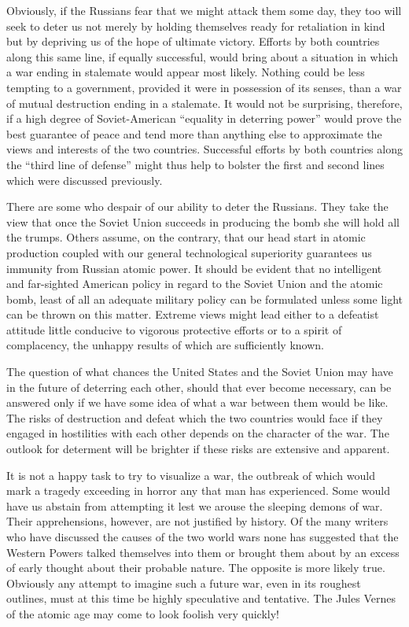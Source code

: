 Obviously, if the Russians fear that we might attack them some day, they too will seek to deter us not merely by holding themselves ready for retaliation in kind but by depriving us of the hope of ultimate victory. Efforts by both countries along this same line, if equally successful, would bring about a situation in which a war ending in stalemate would appear most likely. Nothing could be less tempting to a government, provided it were in possession of its senses, than a war of mutual destruction ending in a stalemate. It would not be surprising, therefore, if a high degree of Soviet-American ``equality in deterring power'' would prove the best guarantee of peace and tend more than anything else to approximate the views and interests of the two countries. Successful efforts by both countries along the ``third line of defense'' might thus help to bolster the first and second lines which were discussed previously.

There are some who despair of our ability to deter the Russians. They take the view that once the Soviet Union succeeds in producing the bomb she will hold all the trumps. Others assume, on the contrary, that our head start in atomic production coupled with our general technological superiority guarantees us immunity from Russian atomic power. It should be evident that no intelligent and far-sighted American policy in regard to the Soviet Union and the atomic bomb, least of all an adequate military policy can be formulated unless some light can be thrown on this matter. Extreme views might lead either to a defeatist attitude little conducive to vigorous protective efforts or to a spirit of complacency, the unhappy results of which are sufficiently known.

The question of what chances the United States and the Soviet Union may have in the future of deterring each other, should that ever become necessary, can be answered only if we have some idea of what a war between them would be like. The risks of destruction and defeat which the two countries would face if they engaged in hostilities with each other depends on the character of the war. The outlook for determent will be brighter if these risks are extensive and apparent.

It is not a happy task to try to visualize a war, the outbreak of which would mark a tragedy exceeding in horror any that man has experienced. Some would have us abstain from attempting it lest we arouse the sleeping demons of war. Their apprehensions, however, are not justified by history. Of the many writers who have discussed the causes of the two world wars none has suggested that the Western Powers talked themselves into them or brought them about by an excess of early thought about their probable nature. The opposite is more likely true. Obviously any attempt to imagine such a future war, even in its roughest outlines, must at this time be highly speculative and tentative. The Jules Vernes of the atomic age may come to look foolish very quickly!

